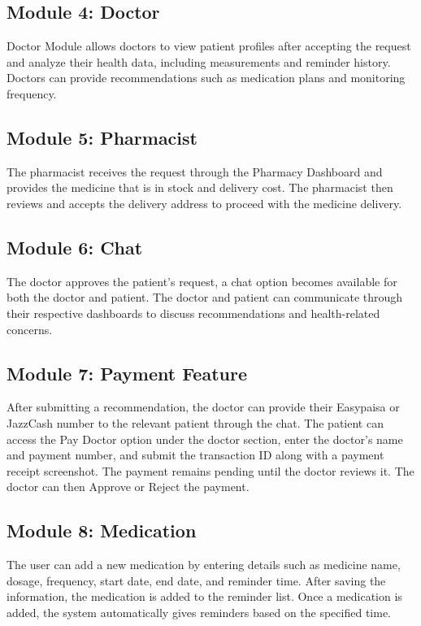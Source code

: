 \documentclass[12pt, a4paper, oneside]{report}
\begin{document}
\subsection{Module 4: Doctor}
Doctor Module allows doctors to view patient profiles after accepting the request and analyze their health data, including measurements and reminder history. Doctors can provide recommendations such as medication plans and monitoring frequency.

\subsection{Module 5: Pharmacist}
The pharmacist receives the request through the Pharmacy Dashboard and provides the medicine that is in stock and delivery cost. The pharmacist then reviews and accepts the delivery address to proceed with the medicine delivery.

\subsection{Module 6: Chat}
The doctor approves the patient's request, a chat option becomes available for both the doctor and patient. The doctor and patient can communicate through their respective dashboards to discuss recommendations and health-related concerns.

\subsection{Module 7: Payment Feature}
After submitting a recommendation, the doctor can provide their Easypaisa or JazzCash number to the relevant patient through the chat. The patient can access the Pay Doctor option under the doctor section, enter the doctor's name and payment number, and submit the transaction ID along with a payment receipt screenshot. The payment remains pending until the doctor reviews it. The doctor can then Approve or Reject the payment.

\subsection{Module 8: Medication}
The user can add a new medication by entering details such as medicine name, dosage, frequency, start date, end date, and reminder time. After saving the information, the medication is added to the reminder list. Once a medication is added, the system automatically gives reminders based on the specified time.
\end{document}
